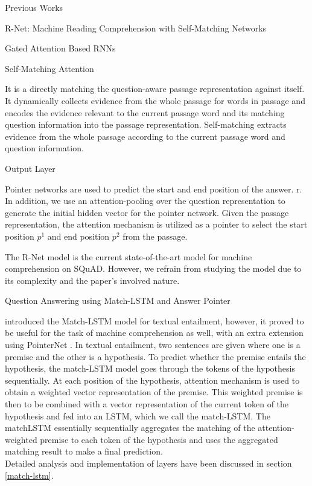 \documentclass{article}
\begin{document}
\begin{psection}{Previous Works}
\begin{psubsection}{R-Net: Machine Reading Comprehension with Self-Matching Networks}
\begin{subsubsection}{Gated Attention Based RNNs}
		\end{subsubsection}

		\begin{subsubsection}{Self-Matching Attention}

			It is a directly matching the question-aware passage representation against itself. It dynamically collects evidence from the whole passage for words in passage and encodes the evidence relevant to the current passage word and its matching question information into the passage representation. Self-matching extracts evidence from the whole passage according to the current passage word and question information.

		\end{subsubsection}

		\begin{subsubsection}{Output Layer}

			Pointer networks are used to predict the start and end position of the answer. r. In addition, we use an attention-pooling over the question representation to generate the initial hidden vector for the pointer network. Given the passage representation, the attention mechanism is utilized as a pointer to select the start position $p^1$ and end position $p^2$ from the passage.

		\end{subsubsection}

		\sloppy
		The R-Net model is the current state-of-the-art model for machine comprehension on SQuAD. However, we refrain from studying the model due to its complexity and the paper's involved nature.

	\end{psubsection}

	\begin{psubsection}{Question Answering using Match-LSTM and Answer Pointer}

        \cite{match-lstm-mc} introduced the Match-LSTM \citep{match-lstm} model for textual entailment, however, it proved to be useful for the task of machine comprehension as well, with an extra extension using PointerNet \citep{pointernet}. In textual entailment, two sentences are given where one is a premise and the other is a hypothesis. To predict whether the premise entails the hypothesis, the match-LSTM model goes through the tokens of the hypothesis sequentially. At each position of the hypothesis, attention mechanism is used to obtain a weighted vector representation
        of the premise. This weighted premise is then to be combined with a vector representation of the current token of the hypothesis and fed into an LSTM, which we call the match-LSTM. The matchLSTM essentially sequentially aggregates the matching of the attention-weighted premise to each token of the hypothesis and uses the aggregated matching result to make a final prediction.\\
        Detailed analysis and implementation of layers have been discussed in section \ref{match-lstm}.


\end{psubsection}
\end{psection}
\end{document}

